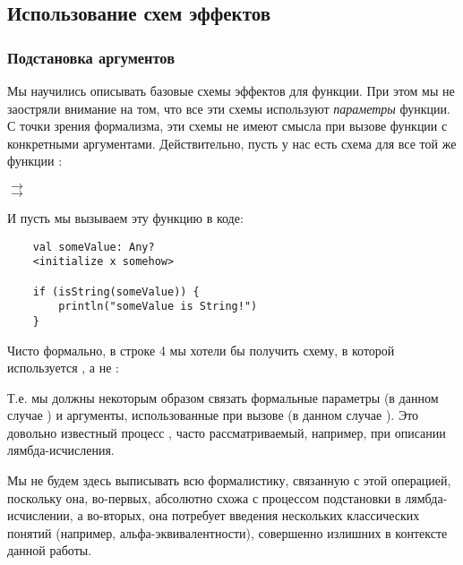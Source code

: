 \subsection{Использование схем эффектов}

\subsubsection{Подстановка аргументов}

\label{section-arguments-substitution}

Мы научились описывать базовые схемы эффектов для функции. При этом мы не заостряли внимание на том, что все эти схемы используют \emph{параметры} функции. С точки зрения формализма, эти схемы не имеют смысла при вызове функции с конкретными аргументами. Действительно, пусть у нас есть схема для все той же функции :

{
         $\rightarrow$  \\
         $\rightarrow$ 
}
{}

И пусть мы вызываем эту функцию в коде:

\begin{verbatim}
    val someValue: Any?
    <initialize x somehow>
    
    if (isString(someValue)) {
        println("someValue is String!")
    }
\end{verbatim}

Чисто формально, в строке 4 мы хотели бы получить схему, в которой используется , а не :


Т.е. мы должны некоторым образом связать формальные параметры (в данном случае ) и аргументы, использованные при вызове (в данном случае ). Это довольно известный процесс , часто рассматриваемый, например, при описании лямбда-исчисления. 

Мы не будем здесь выписывать всю формалистику, связанную с этой операцией, поскольку она, во-первых, абсолютно схожа с процессом подстановки в лямбда-исчислении, а во-вторых, она потребует введения нескольких классических понятий (например, альфа-эквивалентности), совершенно излишних в контексте данной работы. 

